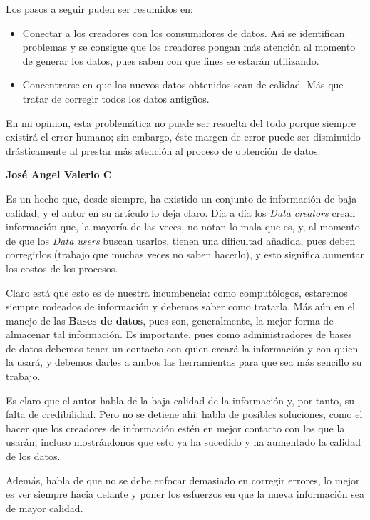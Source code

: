 \documentclass{article}
\begin{document}
Los pasos a seguir puden ser resumidos en:
\begin{itemize}
    \item Conectar a los creadores con los consumidores de datos. Así se identifican problemas y se consigue que los creadores 
    pongan más atención al momento de generar los datos, pues saben con que fines se estarán utilizando.
    \item Concentrarse en que los nuevos datos obtenidos sean de calidad. Más que tratar de corregir todos los datos antigüos.
\end{itemize}

En mi opinion, esta problemática no puede ser resuelta del todo porque siempre existirá el error humano; sin embargo, éste 
margen de error puede ser disminuido drásticamente al prestar más atención al proceso de obtención de datos.

\vspace{4mm}
\begin{center}
    \textbf{José Angel Valerio C}
\end{center}

Es un hecho que, desde siempre, ha existido un conjunto de información de baja calidad, y el autor
en su artículo lo deja claro. Día a día los \textit{Data creators} crean información que,
la mayoría de las veces, no notan lo mala que es, y, al momento de que los \textit{Data
users} buscan usarlos, tienen una dificultad añadida, pues deben corregirlos (trabajo que
muchas veces no saben hacerlo), y esto significa aumentar los costos de los procesos.

Claro está que esto es de nuestra incumbencia: como computólogos, estaremos siempre
rodeados de información y debemos saber como tratarla. Más aún en el manejo de las
\textbf{Bases de datos}, pues son, generalmente, la mejor forma de almacenar tal información.
Es importante, pues como administradores de bases de datos debemos tener un contacto con
quien creará la información y con quien la usará, y debemos darles a ambos las herramientas
para que sea más sencillo su trabajo.

Es claro que el autor habla de la baja calidad de la información y, por tanto, su falta
de credibilidad. Pero no se detiene ahí: habla de posibles soluciones, como el hacer que los
creadores de información estén en mejor contacto con los que la usarán, incluso mostrándonos
que esto ya ha sucedido y ha aumentado la calidad de los datos.

Además, habla de que no se debe enfocar demasiado en corregir errores, lo mejor es
ver siempre hacia delante y poner los esfuerzos en que la nueva información sea de mayor
calidad.
\end{document}
